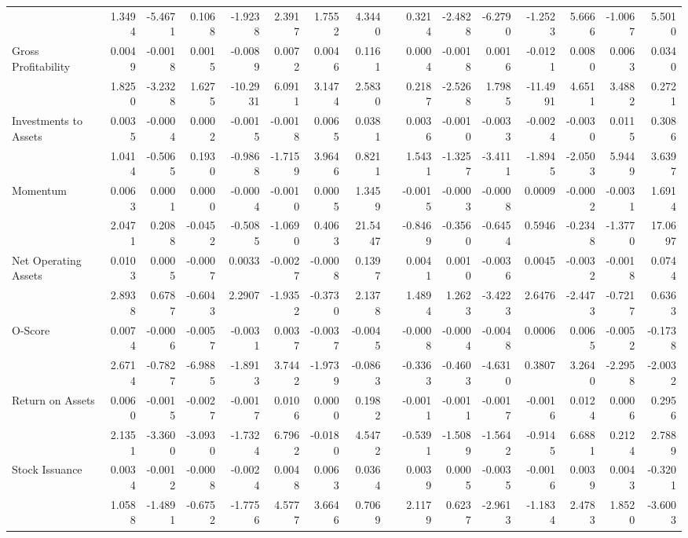 \begin{table}[h]
{\begin{tabular}{lrrrrrrrrrrrrrrr}
            & 1.3494 & -5.4671 & 0.1068 & -1.9238 & 2.3917 & 1.7552 & 4.3440 &       & 0.3214 & -2.4828 & -6.2790 & -1.2523 & 5.6666 & -1.0067 & 5.5010 \\
      Gross Profitability & 0.0049 & -0.0018 & 0.0015 & -0.0089 & 0.0072 & 0.0046 & 0.1161 &       & 0.0004 & -0.0018 & 0.0016 & -0.0121 & 0.0080 & 0.0063 & 0.0340 \\
            & 1.8250 & -3.2328 & 1.6275 & -10.2931 & 6.0911 & 3.1474 & 2.5830 &       & 0.2187 & -2.5268 & 1.7985 & -11.4991 & 4.6511 & 3.4882 & 0.2721 \\
      Investments to Assets & 0.0035 & -0.0004 & 0.0002 & -0.0015 & -0.0018 & 0.0065 & 0.0381 &       & 0.0036 & -0.0010 & -0.0033 & -0.0024 & -0.0030 & 0.0115 & 0.3086 \\
            & 1.0414 & -0.5065 & 0.1930 & -0.9868 & -1.7159 & 3.9646 & 0.8211 &       & 1.5431 & -1.3257 & -3.4111 & -1.8945 & -2.0503 & 5.9449 & 3.6397 \\
      Momentum & 0.0063 & 0.0001 & 0.0000 & -0.0004 & -0.0010 & 0.0005 & 1.3459 &       & -0.0015 & -0.0003 & -0.0008 & 0.0009 & -0.0002 & -0.0031 & 1.6914 \\
            & 2.0471 & 0.2088 & -0.0452 & -0.5085 & -1.0690 & 0.4063 & 21.5447 &       & -0.8469 & -0.3560 & -0.6454 & 0.5946 & -0.2348 & -1.3770 & 17.0697 \\
      Net Operating Assets & 0.0103 & 0.0005 & -0.0007 & 0.0033 & -0.0027 & -0.0008 & 0.1397 &       & 0.0041 & 0.0010 & -0.0036 & 0.0045 & -0.0032 & -0.0018 & 0.0744 \\
            & 2.8938 & 0.6787 & -0.6043 & 2.2907 & -1.9352 & -0.3730 & 2.1378 &       & 1.4894 & 1.2623 & -3.4223 & 2.6476 & -2.4473 & -0.7217 & 0.6363 \\
      O-Score & 0.0074 & -0.0006 & -0.0057 & -0.0031 & 0.0037 & -0.0037 & -0.0045 &       & -0.0008 & -0.0004 & -0.0048 & 0.0006 & 0.0065 & -0.0052 & -0.1738 \\
            & 2.6714 & -0.7827 & -6.9885 & -1.8913 & 3.7442 & -1.9739 & -0.0863 &       & -0.3363 & -0.4603 & -4.6310 & 0.3807 & 3.2640 & -2.2958 & -2.0032 \\
      Return on Assets & 0.0060 & -0.0015 & -0.0027 & -0.0017 & 0.0106 & 0.0000 & 0.1982 &       & -0.0011 & -0.0011 & -0.0017 & -0.0016 & 0.0124 & 0.0006 & 0.2956 \\
            & 2.1351 & -3.3600 & -3.0930 & -1.7324 & 6.7962 & -0.0180 & 4.5472 &       & -0.5391 & -1.5089 & -1.5642 & -0.9145 & 6.6881 & 0.2124 & 2.7889 \\
      Stock Issuance & 0.0034 & -0.0012 & -0.0008 & -0.0024 & 0.0048 & 0.0063 & 0.0364 &       & 0.0039 & 0.0005 & -0.0035 & -0.0016 & 0.0039 & 0.0043 & -0.3201 \\
            & 1.0588 & -1.4891 & -0.6752 & -1.7756 & 4.5777 & 3.6646 & 0.7069 &       & 2.1179 & 0.6237 & -2.9613 & -1.1834 & 2.4783 & 1.8520 & -3.6003 \\
      \bottomrule
      \end{tabular}%
    }
    \label{tab:vol-ff6}%
  \end{table}%

